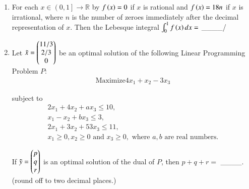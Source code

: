 \documentclass[journal]{IEEEtran}
\begin{document}
\begin{enumerate}
    \item For each $x \in \left( 0,1 \right] \rightarrow \mathbb{R}$ by $f\left(x\right) = 0$ if $x$ is rational and $f\left(x\right) = 18n$ if $x$ is irrational, where $n$ is the number of zeroes immediately after the decimal representation of $x$. Then the Lebesque integral $\int_0^1 f \left(x\right) dx =$ \_\_\_\_/

    \item \label{55} Let $\tilde{x} = \begin{pmatrix}11/3 \\ 2/3 \\ 0\end{pmatrix}$ be an optimal solution of the following Linear Programming Problem $P:$
        \begin{align*}
            \text{Maximize} 4x_1 + x_2 - 3x_3
        \end{align*}

        subject to
        \begin{align*}
            2x_1 + 4x_2 + a x_3 \leq 10,\\
            x_1 - x_2 + bx_3 \leq 3,\\
            2x_1 + 3x_2 + 53x_3 \leq 11,\\
            x_1 \geq 0, x_2 \geq 0 \text{ and } x_3 \geq 0, \text{ where } a,b \text{ are real numbers.}
        \end{align*}

        If $\tilde{y} = \begin{pmatrix}p\\q\\r\end{pmatrix}$ is an optimal solution of the dual of $P$, then $p+q+r=$ \_\_\_\_. (round off to two decimal places.)
\end{enumerate}



  
\end{document}
